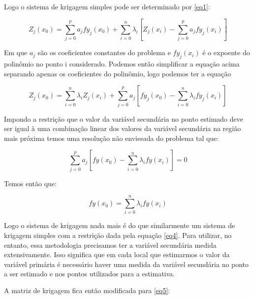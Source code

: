 Logo o sistema de krigagem simples pode ser determinado por \eqref{eq1}: 
 
\begin{equation} \label{eq1}
	Z_{j}(x_{0}) = \sum_{j=0}^{p} a_{j} fy_j(x_0) + \sum_{i=0}^{n}\lambda_{i}\left[ Z_j(x_{i}) - \sum_{j=0}^{p} a_{j} fy_j(x_i)\right]
\end{equation}
 
 Em que $a_j$ são os coeficientes constantes do problema e $fy_j(x_i)$ é o expoente do polinômio no ponto i considerado. Podemos então simplificar a equação acima separando apenas os coeficientes do polinômio, logo podemos ter a equação 
 
 \begin{equation} \label{eq2}
 Z_{j}(x_{0}) = \sum_{i=0}^{n}\lambda_{i}Z_j(x_{i})  + \sum_{j=0}^{p} a_{j}\left[fy_j(x_0) -\sum_{i=0}^{n}\lambda_{i}fy_j(x_i) \right]
 \end{equation}
 
Impondo a restrição que o valor da variável secundária no ponto estimado deve ser igual à uma combinação linear dos valores da variável secundária na região mais próxima temos uma resolução não enviesada do problema tal que:

\begin{equation} \label{eq3}
\sum_{j=0}^{p} a_{j}\left[fy(x_0) -\sum_{i=0}^{n}\lambda_{i}fy(x_i) \right] = 0
\end{equation} 
 
Temos então que:

\begin{equation} \label{eq4}
  fy(x_0) = \sum_{i=0}^{n}\lambda_{i}fy(x_i)
\end{equation}

Logo o sistema de krigagem nada mais é do que similarmente um sistema de krigagem simples com a restrição dada pela equação \eqref{eq4}. Para utilizar, no entanto, essa metodologia precisamos ter a variável secundária medida extensivamente. Isso significa que em cada local que estimarmos o valor da variável primária é necessário haver uma medida da variável secundária no ponto a ser estimado e nos pontos utilizados para a estimativa.  

A matriz de krigagem fica então modificada para \eqref{eq5}: 


